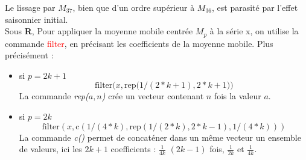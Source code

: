 Le lissage par $M_{37}$, bien que d'un ordre supérieur à $M_{36}$, est parasité par l'effet saisonnier initial.\newline
\\
Sous \textbf{R}, Pour appliquer la moyenne mobile centrée $M_{p}$ à la série x, on utilise la commande \textcolor{red}{filter}, en précisant les coefficients de la moyenne mobile.\newline
Plus précisément :
\begin{itemize}
\item si $p=2k+1$
$$\textrm{filter(}x, \textrm{rep(}1/(2\ast k+1), 2\ast k+1)) $$
La commande \textit{rep($a,n$)} crée un vecteur contenant $n$ fois la valeur $a$.
\item si $p = 2k$
$$\textrm{filter}(x, \textrm{c}(1/(4\ast k), \textrm{rep}(1/(2\ast k), 2\ast k-1), 1/(4\ast k)))$$
La commande \textit{c()} permet de concaténer dans un même vecteur un ensemble de valeurs, ici les $2k +1$ coefficients : $\frac{1}{4k}$ $(2k-1)$ fois, $\frac{1}{2k}$ et $\frac{1}{4k}$.
\end{itemize}
